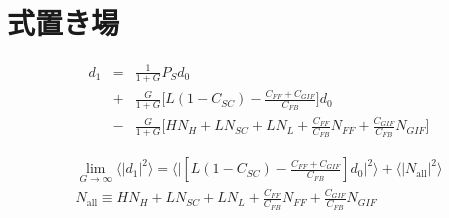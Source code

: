 \documentclass[a4paper,12pt]{jsarticle}
\begin{document}
\section{式置き場}

\begin{eqnarray}
  d_1 &=& \frac{1}{1+G}P_{S}d_0 \\
  &+& \frac{G}{1+G}\Biggl[L(1-C_{SC})-\frac{C_{FF}+C_{GIF}}{C_{FB}}\Biggl]d_0 \nonumber \\
  &-& \frac{G}{1+G}\Biggl[HN_{H} + LN_{SC} + LN_{L} + \frac{C_{FF}}{C_{FB}}N_{FF} + \frac{C_{GIF}}{C_{FB}}N_{GIF} \Biggl] \nonumber
\end{eqnarray}

\begin{eqnarray}
  \lim_{G \to \infty} \langle|d_1|^2\rangle =
  \biggl\langle\biggl|[L(1-C_{SC})-\frac{C_{FF}+C_{GIF}}{C_{FB}}]d_0\biggl|^2\biggl\rangle + \langle|N_{\mathrm{all}}|^2 \rangle \\
N_{\mathrm{all}} \equiv HN_{H} + LN_{SC} + LN_{L} + \frac{C_{FF}}{C_{FB}}N_{FF} + \frac{C_{GIF}}{C_{FB}}N_{GIF} \nonumber
\end{eqnarray}
%
%



\end{document}
